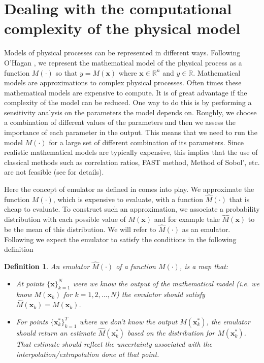 \documentclass[12pt]{book}
\newtheorem{definition}{Definition}
\newcommand{\x}{\textbf{x}}
\begin{document}
\section{Dealing with  the computational complexity of the physical model}
Models of physical processes can be represented in different ways.
Following O'Hagan  \cite{o2006bayesian}, we represent the  mathematical model of the physical process
 as a function
$M(\cdot)$ so that $y=M(\x)$ where $\x\in\mathbb{R}^{n}$   and $y\in\mathbb{R}$.
Mathematical models are approximations to complex physical processes. Often times these mathematical
models are expensive to compute. It is of great advantage if the complexity
of the model can be reduced. One way to do
this is by performing a sensitivity analysis on the parameters the model depends on. Roughly, we choose a
combination of different values of the parameters and then we assess the importance of each parameter in
the output. This means that we need to run the model $M(\cdot)$ for a large set 
of different combination of its parameters.
Since realistic mathematical models are typically expensive,
this implies that   the  use of   classical methods such  as correlation
ratios, FAST method, Method of Sobol', etc. 
 are not feasible (see \cite{saltelli2000sensitivity} for details). 

Here the concept of emulator as defined in \cite{o2006bayesian} 
comes into play. We 
approximate the function $M(\cdot)$, which is  expensive to evaluate,
 with a function $\widehat{M}(\cdot)$ that is cheap to evaluate. To construct such an approximation,   
we  associate a 
probability distribution with each  possible value of $M(\textbf{x})$ and for example take 
$\widehat{M}(\x)$ to be  the mean
of this distribution. We will refer to $\widehat{M}(\cdot)$ as an emulator. 
Following \cite{o2006bayesian} we expect the emulator to satisfy the conditions in 
the following definition
\begin{definition}\label{dfnEmulator}
An emulator $\widehat{M}(\cdot)$ of a function $M(\cdot)$, is a map that:
\begin{itemize}
\item At points $\{\x\}_{k=1}^{N}$  were we know the output of the mathematical model (i.e. we know 
$M(\x_{k})$ for $k=1,2,\ldots, N$)
the emulator should satisfy $\widehat{M}(\x_{k})=M(\x_{k})$.
\item For  points $\{\x_{k}^{*}\}_{k=1}^{T}$ where we don't know the output $M(\x_{k}^{*})$, the emulator should
return an estimate $\widehat{M}(\textbf{x}_{k}^{*})$ based on the distribution for $M(\textbf{x}_{k}^{*})$. 
That estimate should reflect the uncertainty associated with
the interpolation/extrapolation done at that point.
\end{itemize} 
\end{definition}
\end{document}
